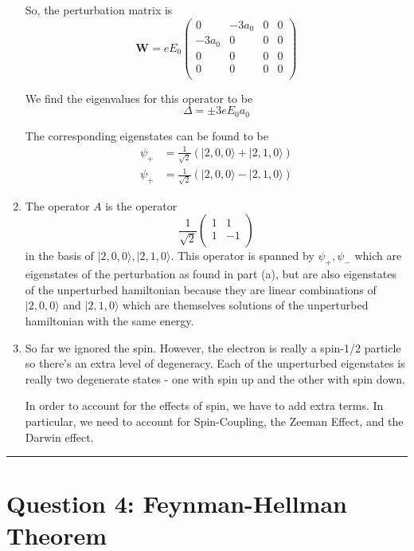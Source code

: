 \documentclass{article}
\newcommand{\ket}[1]{|#1 \rangle}
\begin{document}
\begin{enumerate}[label=(\alph*)]
So, the perturbation matrix is 
\[ \mathbf{W} = e E_0 \begin{pmatrix}
  0 & -3a_0 & 0 & 0 \\
  -3a_0 & 0 & 0 & 0 \\
  0 & 0 & 0 & 0 \\
  0 & 0 & 0 & 0 \\
\end{pmatrix} \]

We find the eigenvalues for this operator to be 
\[ \Delta = \pm 3eE_0 a_0 \]

The corresponding eigenstates can be found to be 
\begin{align*}
  \psi_{+} &= \frac{1}{\sqrt{2}} \left( \ket{2, 0, 0} + \ket{2, 1, 0} \right) \\
  \psi_{+} &= \frac{1}{\sqrt{2}} \left( \ket{2, 0, 0} - \ket{2, 1, 0} \right) 
\end{align*}

\item The operator $A$ is the operator 
\[ \frac{1}{\sqrt{2}}\begin{pmatrix}
  1 & 1 \\
  1 & -1 \\
\end{pmatrix} \]
in the basis of $\ket{2,0,0}, \ket{2,1,0}$. This operator is spanned by $\psi_+, \psi_-$ which are eigenstates of the perturbation as found in part (a), but are also eigenstates of the unperturbed hamiltonian because they are linear combinations of $\ket{2,0,0}$ and $\ket{2,1,0}$ which are themselves solutions of the unperturbed hamiltonian with the same energy.

\item So far we ignored the spin. However, the electron is really a spin-1/2 particle so there's an extra level of degeneracy. Each of the unperturbed eigenstates is really two degenerate states - one with spin up and the other with spin down.

In order to account for the effects of spin, we have to add extra terms. In particular, we need to account for Spin-Coupling, the Zeeman Effect, and the Darwin effect.
\end{enumerate}


\vskip 0.5cm 
\hrule 
\vskip 0.5cm
\pagebreak


\section*{Question 4: Feynman-Hellman Theorem} 
\end{document}
